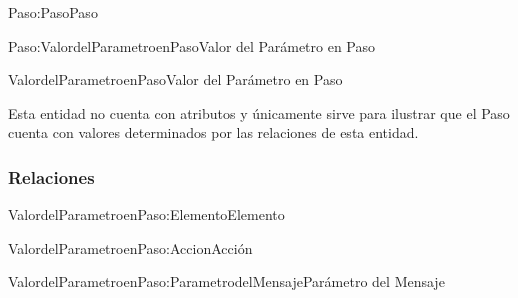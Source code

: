 \begin{BusinessFact}{Paso:Paso}{Paso}
\end{BusinessFact}

\begin{BusinessFact}{Paso:ValordelParametroenPaso}{Valor del Parámetro en Paso}
\end{BusinessFact}


\begin{BusinessEntity}{ValordelParametroenPaso}{Valor del Parámetro en Paso}
	\item Esta entidad no cuenta con atributos y únicamente sirve para ilustrar que el Paso cuenta con valores determinados por las relaciones de esta entidad.
\end{BusinessEntity}

\subsubsection{Relaciones}

\begin{BusinessFact}{ValordelParametroenPaso:Elemento}{Elemento}
\end{BusinessFact}

\begin{BusinessFact}{ValordelParametroenPaso:Accion}{Acción}
\end{BusinessFact}

\begin{BusinessFact}{ValordelParametroenPaso:ParametrodelMensaje}{Parámetro del Mensaje}
\end{BusinessFact}


